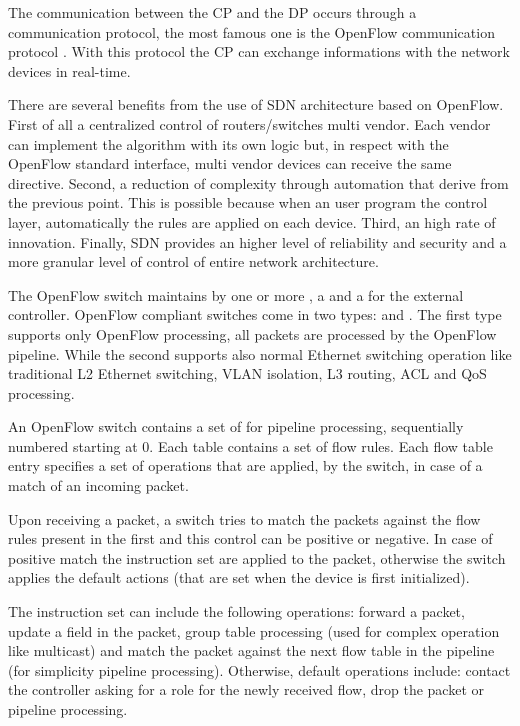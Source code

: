 The communication between the \ac{CP} and the \ac{DP} occurs through a communication protocol, the most famous one is the OpenFlow communication protocol \cite{onf:sdn-description:openflow}. With this protocol the \ac{CP} can exchange informations with the network devices in real-time.

There are several benefits from the use of \ac{SDN} architecture based on OpenFlow. First of all a centralized control of routers/switches multi vendor. Each vendor can implement the algorithm with its own logic but, in respect with the OpenFlow standard interface, multi vendor devices can receive the same directive. Second, a reduction of complexity through automation that derive from the previous point. This is possible because when an user program the control layer, automatically the rules are applied on each device. Third, an high rate of innovation. Finally, \ac{SDN} provides an higher level of reliability and security and a more granular level of control of entire network architecture.

The OpenFlow switch \cite{onf:openflow-specifications:switch-component} maintains by one or more , a  and a  for the external controller. OpenFlow compliant switches come in two types:  and . The first type supports only OpenFlow processing, all packets are processed by the OpenFlow pipeline. While the second supports also normal Ethernet switching operation like traditional L2 Ethernet switching, \acs{VLAN} isolation, L3 routing, \acs{ACL} and \ac{QoS} processing.

An OpenFlow switch contains a set of  for pipeline processing, sequentially numbered starting at 0. Each table contains a set of flow rules. Each flow table entry specifies a set of operations that are applied, by the switch, in case of a match of an incoming packet.

Upon receiving a packet, a switch tries to match the packets against the flow rules present in the first  and this control can be positive or negative. In case of positive match the instruction set are applied to the packet, otherwise the switch applies the default actions (that are set when the device is first initialized).

The instruction set can include the following operations: forward a packet, update a field in the packet, group table processing (used for complex operation like multicast) and match the packet against the next flow table in the pipeline (for simplicity pipeline processing). Otherwise, default operations include: contact the controller asking for a role for the newly received flow, drop the packet or pipeline processing.